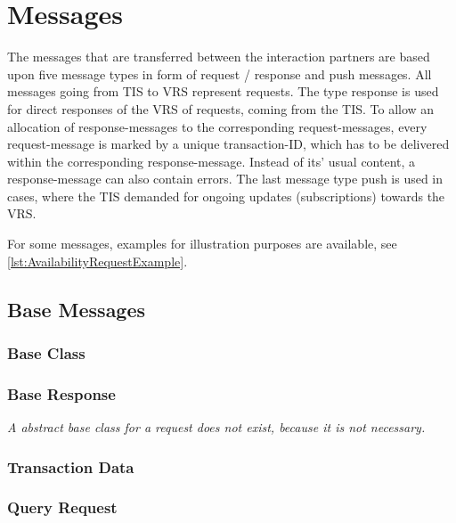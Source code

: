 \chapter{Messages}
\label{cha:Nachrichten}
The messages that are transferred between the interaction partners are based upon five message types in form of request / response and push messages. All messages going from TIS to VRS represent requests. The type response is used for direct responses of the VRS of requests, coming from the TIS. To allow an allocation of response-messages to the corresponding request-messages, every request-message is marked by a unique transaction-ID, which has to be delivered within the corresponding response-message. Instead of its' usual content, a response-message can also contain errors. The last message type push is used in cases, where the TIS demanded for ongoing updates (subscriptions) towards the VRS.

For some messages, examples for illustration purposes are available, see \cref{lst:AvailabilityRequestExample}.

\section{Base Messages}
\label{sec:Nachrichten:Basisnachrichten}

\subsection*{Base Class}



\subsection*{Base Response}


\medskip

\textit{A abstract base class for a request does not exist, because it is not necessary.}

\subsection*{Transaction Data}



\subsection*{Query Request}



